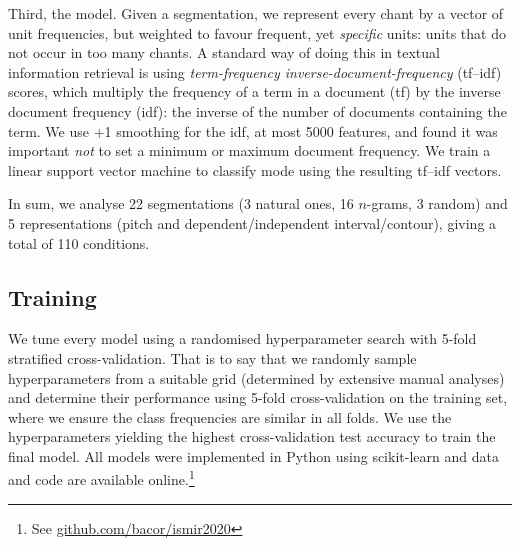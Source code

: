 \documentclass{article}
\begin{document}
Third, the model.
Given a segmentation, we represent every chant by a vector of unit frequencies, but weighted to favour frequent, yet \emph{specific} units: units that do not occur in too many chants.
A standard way of doing this in textual information retrieval is using \emph{term-frequency inverse-document-frequency} (tf--idf) scores, which multiply the frequency of a term in a document (tf) by the inverse document frequency (idf): the inverse of the number of documents containing the term.
We use +1 smoothing for the idf, at most 5000 features, and found it was important \emph{not} to set a minimum or maximum document frequency.
We train a linear support vector machine to classify mode using the resulting tf--idf vectors.


In sum, we analyse 22 segmentations (3 natural ones, 16 $n$-grams, 3 random) and 5 representations (pitch and dependent/independent interval/contour), giving a total of 110 conditions.



\subsection{Training}\label{sec:training}

We tune every model using a randomised hyperparameter search with 5-fold stratified cross-validation. That is to say that we randomly sample hyperparameters from a suitable grid (determined by extensive manual analyses) and determine their performance using 5-fold cross-validation on the training set, where we ensure the class frequencies are similar in all folds. We use the hyperparameters yielding the highest cross-validation test accuracy to train the final model.
All models were implemented in Python using scikit-learn \cite{scikit-learn} and data and code are available online.\footnote{%
    See \href{https://github.com/bacor/ISMIR2020}{github.com/bacor/ismir2020}
}
\end{document}
